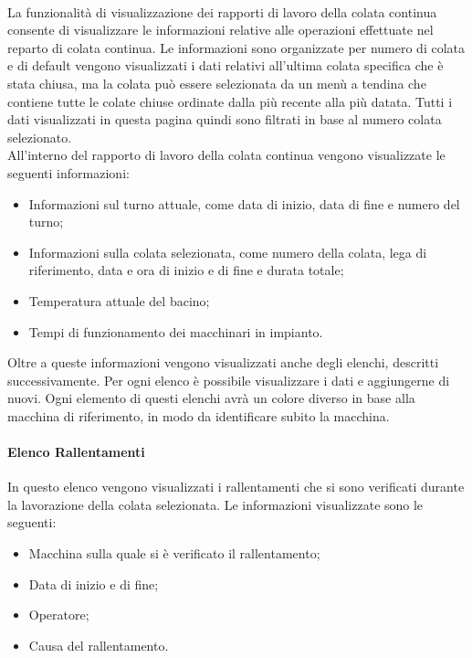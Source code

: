   \paragraph{}
  La funzionalità di visualizzazione dei rapporti di lavoro della colata continua consente di visualizzare 
  le informazioni relative alle operazioni effettuate nel reparto di colata continua. Le informazioni sono 
  organizzate per numero di colata e di default vengono visualizzati i dati relativi all'ultima colata specifica che è 
  stata chiusa, ma la colata può essere selezionata da un menù a tendina che contiene tutte le colate chiuse ordinate 
  dalla più recente alla più datata. Tutti i dati visualizzati in questa pagina quindi sono filtrati in base al numero colata selezionato.\\
  All’interno del rapporto di lavoro della colata continua vengono visualizzate le seguenti informazioni:
  \begin{itemize}
    \item Informazioni sul turno attuale, come data di inizio, data di fine e numero del turno;
    \item Informazioni sulla colata selezionata, come numero della colata, lega di riferimento, data e ora 
    di inizio e di fine e durata totale;
    \item Temperatura attuale del bacino;
    \item Tempi di funzionamento dei macchinari in impianto.
  \end{itemize}
  Oltre a queste informazioni vengono visualizzati anche degli elenchi, descritti successivamente. 
  Per ogni elenco è possibile visualizzare i dati e aggiungerne di nuovi. Ogni elemento di questi elenchi 
  avrà un colore diverso in base alla macchina di riferimento, in modo da identificare subito la macchina.
  
  \paragraph{Elenco Rallentamenti}
  In questo elenco vengono visualizzati i rallentamenti che si sono verificati durante la lavorazione della colata 
  selezionata. Le informazioni visualizzate sono le seguenti:
  \begin{itemize}
    \item Macchina sulla quale si è verificato il rallentamento;
    \item Data di inizio e di fine;
    \item Operatore;
    \item Causa del rallentamento.
  \end{itemize} 

